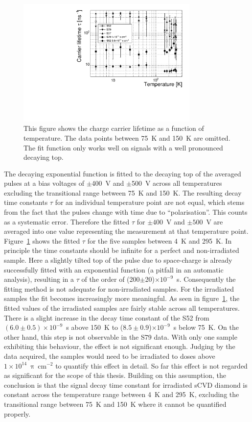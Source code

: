 \begin{figure}[!t]
\centering
\includegraphics[width=0.80\textwidth]{03_measurement_results/scripts/plots/taunew/lifetimevstemp}
\caption{This figure shows the charge carrier lifetime as a function of temperature. The data points between 75~K and 150~K are omitted. The fit function only works well on signals with a well pronounced decaying top.}
 \label{fig:lifetimevstemp}
\end{figure}

The decaying exponential function is fitted to the decaying top of the averaged pulses at a bias voltages of $\pm$400~V and $\pm$500~V across all temperatures excluding the transitional range between 75~K and 150~K. The resulting decay time constants $\tau$ for an individual temperature point are not equal, which stems from the fact that the pulses change with time due to ``polarisation''. This counts as a systematic error. Therefore the fitted $\tau$ for $\pm400$~V and $\pm500$~V are averaged into one value representing the measurement at that temperature point. Figure~\ref{fig:lifetimevstemp} shows the fitted $\tau$ for the five samples between 4~K and 295~K. In principle the time constants should be infinite for a perfect and non-irradiated sample. Here a slightly tilted top of the pulse due to space-charge is already successfully fitted with an exponential function (a pitfall in an automatic analysis), resulting in a $\tau$ of the order of (200$\pm$20)$\times10^{-9}$~s. Consequently the fitting method is not adequate for non-irradiated samples. For the irradiated samples the fit becomes increasingly more meaningful. As seen in figure~\ref{fig:lifetimevstemp}, the fitted values of the irradiated samples are fairly stable across all temperatures. There is a slight increase in the decay time constant of the S52 from $(6.0\pm0.5)\times10^{-9}$~s above 150~K to ($8.5\pm0.9$)$\times10^{-9}$~s below 75~K. On the other hand, this step is not observable in the S79 data. With only one sample exhibiting this behaviour, the effect is not significant enough. Judging by the data acquired, the samples would need to be irradiated to doses above $1\times10^{14}~\uppi~$cm$^{-2}$ to quantify this effect in detail. So far this effect is not regarded as significant for the scope of this thesis. Building on this assumption, the conclusion is that the signal decay time constant for irradiated sCVD diamond is constant across the temperature range between 4~K and 295~K, excluding the transitional range between 75~K and 150~K  where it cannot be quantified properly. 



